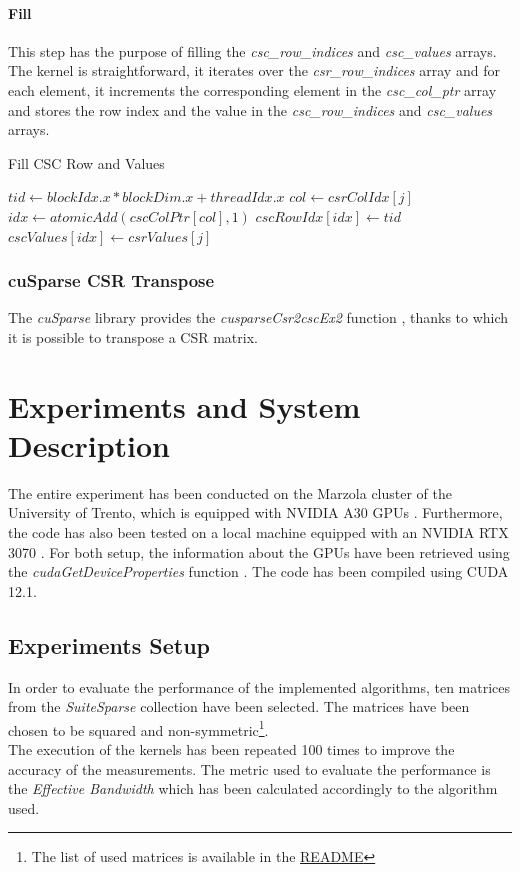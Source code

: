 \documentclass{IEEEconf}
\begin{document}
\paragraph{Fill}
This step has the purpose of filling the \textit{csc\_row\_indices} and \textit{csc\_values} arrays.
The kernel is straightforward, it iterates over the \textit{csr\_row\_indices} array and for each element,
it increments the corresponding element in the \textit{csc\_col\_ptr} array and stores the row index and
the value in the \textit{csc\_row\_indices} and \textit{csc\_values} arrays.
\begin{algorithm}
    \caption{Fill CSC Row and Values}
    \begin{algorithmic}
            \State $tid \gets blockIdx.x * blockDim.x + threadIdx.x$
                    \State $col \gets csrColIdx[j]$
                    \State $idx \gets atomicAdd(cscColPtr[col], 1)$
                    \State $cscRowIdx[idx] \gets tid$
                    \State $cscValues[idx] \gets csrValues[j]$
                \EndFor
            \EndIf
        \EndProcedure
    \end{algorithmic}
\end{algorithm}
\subsubsection{cuSparse CSR Transpose}
The \textit{cuSparse} library provides the \textit{cusparseCsr2cscEx2} function \cite{cusparse:csr2cscex2}, thanks to which
it is possible to transpose a CSR matrix.
\section{Experiments and System Description}
The entire experiment has been conducted on the Marzola cluster of the University of Trento, 
which is equipped with NVIDIA A30 GPUs \cite{nvidia:a30}.
Furthermore, the code has also been tested on a local machine equipped with an NVIDIA RTX 3070 \cite{nvidia:rtx3070}.
For both setup, the information about the GPUs have been retrieved using the \textit{cudaGetDeviceProperties} function \cite{nvidia:cudaDeviceProp}.
The code has been compiled using CUDA 12.1.
\subsection{Experiments Setup}
In order to evaluate the performance of the implemented algorithms, ten matrices from the \textit{SuiteSparse} \cite{spm:suitesparse} collection
have been selected. The matrices have been chosen to be squared and non-symmetric\footnote{The list of used matrices is available in the \href{https://github.com/SecondarySkyler/gpu-computing-project}{README}}. \\
The execution of the kernels has been repeated 100 times to improve the accuracy of the measurements. The metric used to evaluate the performance is the \textit{Effective Bandwidth} which has 
been calculated accordingly to the algorithm used.
\end{document}
